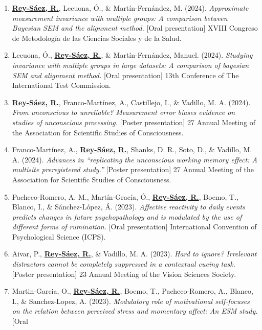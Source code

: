 \documentclass[
  letterpaper,
  DIV=11,
  numbers=noendperiod]{scrartcl}
\begin{document}
\begin{enumerate}
  (2024). \emph{What psychometrics can offer to experimental psychology:
  The multilevel model as the legacy of factor analysis.} {[}Oral
  presentation{]} XVIII Congreso de Metodología de las Ciencias Sociales
  y de la Salud.
\item
  \ul{\textbf{Rey-Sáez, R.}}, Lecuona, Ó., \& Martín-Fernández, M.
  (2024). \emph{Approximate measurement invariance with multiple groups:
  A comparison between Bayesian SEM and the alignment method.} {[}Oral
  presentation{]} XVIII Congreso de Metodología de las Ciencias Sociales
  y de la Salud.
\item
  Lecuona, Ó., \ul{\textbf{Rey-Sáez, R.}}, \& Martín-Fernández, Manuel.
  (2024). \emph{Studying invariance with multiple groups in large
  datasets: A comparison of bayesian SEM and alignment method.} {[}Oral
  presentation{]} 13th Conference of The International Test Commission.
\item
  \ul{\textbf{Rey-Sáez, R.}}, Franco-Martínez, A., Castillejo, I., \&
  Vadillo, M. A. (2024). \emph{From unconscious to unreliable?
  Measurement error biases evidence on studies of unconscious
  processing.} {[}Poster presentation{]} 27 Annual Meeting of the
  Association for Scientific Studies of Consciousness.
\item
  Franco-Martínez, A., \ul{\textbf{Rey-Sáez, R.}}, Shanks, D. R., Soto,
  D., \& Vadillo, M. A. (2024). \emph{Advances in ``replicating the
  unconscious working memory effect: A multisite preregistered study.''}
  {[}Poster presentation{]} 27 Annual Meeting of the Association for
  Scientific Studies of Consciousness.
\item
  Pacheco-Romero, A. M., Martín-Gracía, Ó., \ul{\textbf{Rey-Sáez, R.}},
  Boemo, T., Blanco, I., \& Sánchez-López, Á. (2023). \emph{Affective
  reactivity to daily events predicts changes in future psychopathology
  and is modulated by the use of different forms of rumination.} {[}Oral
  presentation{]} International Convention of Psychological Science
  (ICPS).
\item
  Aivar, P., \ul{\textbf{Rey-Sáez, R.}}, \& Vadillo, M. A. (2023).
  \emph{Hard to ignore? Irrelevant distractors cannot be completely
  suppressed in a contextual cueing task.} {[}Poster presentation{]} 23
  Annual Meeting of the Vision Sciences Society.
\item
  Martin-Garcia, O., \ul{\textbf{Rey-Sáez, R.}}, Boemo, T.,
  Pacheco-Romero, A., Blanco, I., \& Sanchez-Lopez, A. (2023).
  \emph{Modulatory role of motivational self-focuses on the relation
  between perceived stress and momentary affect: An ESM study.} {[}Oral

\end{enumerate}
\end{document}
